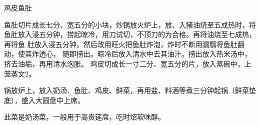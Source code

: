\begin{recipe}{鸡皮鱼肚}

\ingredients


\preparation

\step 鱼肚切片成长七分、宽五分的小块，炒锅放火炉上，放、入猪油烧至五成热时，将
鱼肚放入浸五分钟，捞起晾冷，用刀试切，不顶刀的为合格。再将油烧至七成热，再将鱼
肚放入浸五分钟。然后改用旺火把鱼肚炸泡，炸时不断用漏瓢将鱼肚翻动，使其炸透心，
随即捞出。晾冷后放入清水中去其油汁。捞出放入热米汤中，挤去油垢，再用清水泡胀。
鸡皮切成长一寸二分、宽五分的片，放入蒸碗中，上笼蒸文2。

\step 锅放炉上，放入奶汤、鱼肚、鸡皮、鲜菜，再用盐、料酒等煮三分钟起锅（鲜菜垫
底），盛入大圆盘中上席。

\features

此菜是奶汤菜，一般用于高贵筵席，吃时炤软味醇。

\end{recipe}

